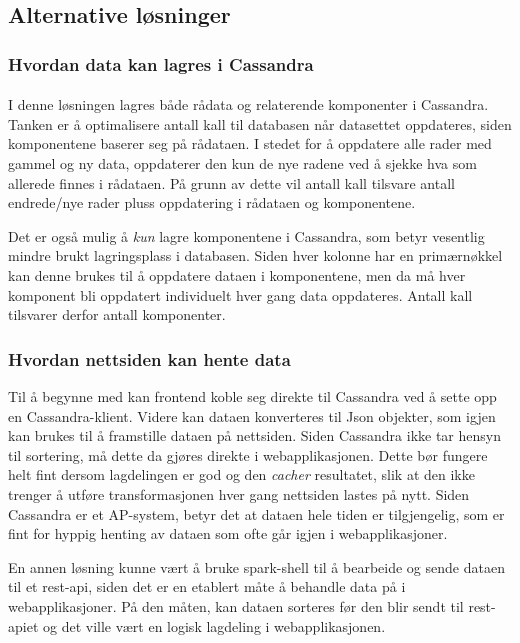 \subsection{Alternative løsninger}

\subsubsection{Hvordan data kan lagres i Cassandra}
\paragraph{}
I denne løsningen lagres både rådata og relaterende komponenter i Cassandra. Tanken er å optimalisere antall kall til databasen når datasettet oppdateres, siden komponentene baserer seg på rådataen. I stedet for å oppdatere alle rader med gammel og ny data, oppdaterer den kun de nye radene ved å sjekke hva som allerede finnes i rådataen. På grunn av dette vil antall kall tilsvare antall endrede/nye rader pluss oppdatering i rådataen og komponentene.

Det er også mulig å \textit{kun} lagre komponentene i Cassandra, som betyr vesentlig mindre brukt lagringsplass i databasen. Siden hver kolonne har en primærnøkkel kan denne brukes til å oppdatere dataen i komponentene, men da må hver komponent bli oppdatert individuelt hver gang data oppdateres. Antall kall tilsvarer derfor antall komponenter.

\subsubsection{Hvordan nettsiden kan hente data}
Til å begynne med kan frontend koble seg direkte til Cassandra ved å sette opp en Cassandra-klient. Videre kan dataen konverteres til Json objekter, som igjen kan brukes til å framstille dataen på nettsiden. Siden Cassandra ikke tar hensyn til sortering, må dette da gjøres direkte i webapplikasjonen. Dette bør fungere helt fint dersom lagdelingen er god og den \textit{cacher} resultatet, slik at den ikke trenger å utføre transformasjonen hver gang nettsiden lastes på nytt. Siden Cassandra er et AP-system, betyr det at dataen hele tiden er tilgjengelig, som er fint for hyppig henting av dataen som ofte går igjen i webapplikasjoner.

En annen løsning kunne vært å bruke spark-shell til å bearbeide og sende dataen til et rest-api, siden det er en etablert måte å behandle data på i webapplikasjoner. På den måten, kan dataen sorteres før den blir sendt til rest-apiet og det ville vært en logisk lagdeling i webapplikasjonen.
